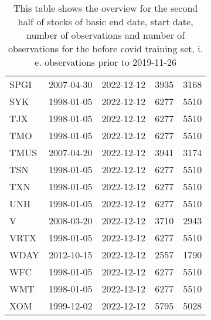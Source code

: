 \begin{table}[ht]
\begin{tabular}{lllrr}
  SPGI & 2007-04-30 & 2022-12-12 & 3935 & 3168 \\ 
  SYK & 1998-01-05 & 2022-12-12 & 6277 & 5510 \\ 
  TJX & 1998-01-05 & 2022-12-12 & 6277 & 5510 \\ 
  TMO & 1998-01-05 & 2022-12-12 & 6277 & 5510 \\ 
  TMUS & 2007-04-20 & 2022-12-12 & 3941 & 3174 \\ 
  TSN & 1998-01-05 & 2022-12-12 & 6277 & 5510 \\ 
  TXN & 1998-01-05 & 2022-12-12 & 6277 & 5510 \\ 
  UNH & 1998-01-05 & 2022-12-12 & 6277 & 5510 \\ 
  V & 2008-03-20 & 2022-12-12 & 3710 & 2943 \\ 
  VRTX & 1998-01-05 & 2022-12-12 & 6277 & 5510 \\ 
  WDAY & 2012-10-15 & 2022-12-12 & 2557 & 1790 \\ 
  WFC & 1998-01-05 & 2022-12-12 & 6277 & 5510 \\ 
  WMT & 1998-01-05 & 2022-12-12 & 6277 & 5510 \\ 
  XOM & 1999-12-02 & 2022-12-12 & 5795 & 5028 \\ 
   \hline
\end{tabular}
\caption[Overview_2]{This table shows the overview for the second half of stocks of basic end date, start date, number of observations and number of observations 
                     for the before covid training set, i. e. observations prior to 2019-11-26} 
\label{Table:Overview_2}
\end{table}
